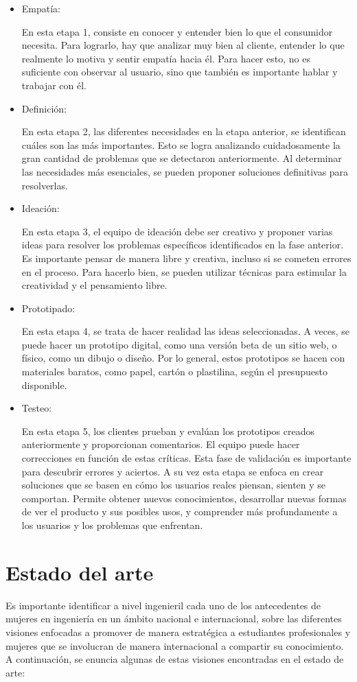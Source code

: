\documentclass[hidelinks]{Documento}
\begin{document}
\begin{itemize}
    \item Empatía:
    
    En esta etapa 1, consiste en conocer y entender bien lo que el consumidor necesita. Para lograrlo, hay que analizar muy bien al cliente, entender lo que realmente lo motiva y sentir empatía hacia él. Para hacer esto, no es suficiente con observar al usuario, sino que también es importante hablar y trabajar con él.
    \item Definición:

    En esta etapa 2, las diferentes necesidades en la etapa anterior, se identifican cuáles son las más importantes. Esto se logra analizando cuidadosamente la gran cantidad de problemas que se detectaron anteriormente. Al determinar las necesidades más esenciales, se pueden proponer soluciones definitivas para resolverlas.
    \item Ideación:

    En esta etapa 3, el equipo de ideación debe ser creativo y proponer varias ideas para resolver los problemas específicos identificados en la fase anterior. Es importante pensar de manera libre y creativa, incluso si se cometen errores en el proceso. Para hacerlo bien, se pueden utilizar técnicas para estimular la creatividad y el pensamiento libre. 
    \item Prototipado:

    En esta etapa 4, se trata de hacer realidad las ideas seleccionadas. A veces, se puede hacer un prototipo digital, como una versión beta de un sitio web, o físico, como un dibujo o diseño. Por lo general, estos prototipos se hacen con materiales baratos, como papel, cartón o plastilina, según el presupuesto disponible.
    \item Testeo:

    En esta etapa 5, los clientes prueban y evalúan los prototipos creados anteriormente y proporcionan comentarios. El equipo puede hacer correcciones en función de estas críticas. Esta fase de validación es importante para descubrir errores y aciertos. A su vez esta etapa se enfoca en crear soluciones que se basen en cómo los usuarios reales piensan, sienten y se comportan. Permite obtener nuevos conocimientos, desarrollar nuevas formas de ver el producto y sus posibles usos, y comprender más profundamente a los usuarios y los problemas que enfrentan.

\end{itemize}
 

\section{Estado del arte}
Es importante identificar a nivel ingenieril cada uno de los antecedentes de mujeres en ingeniería en un ámbito nacional e internacional, sobre las diferentes visiones enfocadas a promover de manera estratégica a estudiantes profesionales y mujeres que se involucran de manera internacional a compartir su conocimiento. A continuación, se enuncia algunas de estas visiones encontradas en el estado de arte:
\end{document}
